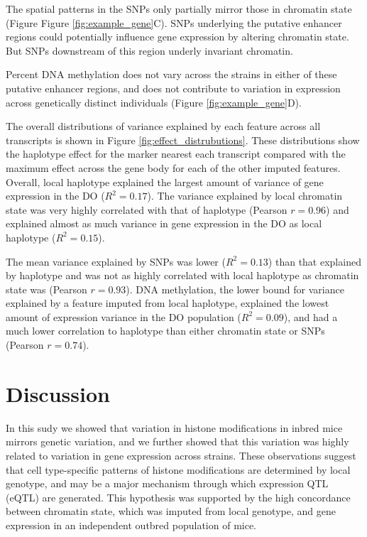 \documentclass[10pt,letterpaper]{article}
\begin{document}
The spatial patterns in the SNPs only partially mirror those in
chromatin state (Figure Figure \ref{fig:example_gene}C). SNPs underlying
the putative enhancer regions could potentially influence gene
expression by altering chromatin state. But SNPs downstream of this
region underly invariant chromatin.

Percent DNA methylation does not vary across the strains in either of
these putative enhancer regions, and does not contribute to variation in
expression across genetically distinct individuals (Figure
\ref{fig:example_gene}D).

The overall distributions of variance explained by each feature across
all transcripts is shown in Figure \ref{fig:effect_distrubutions}. These
distributions show the haplotype effect for the marker nearest each
transcript compared with the maximum effect across the gene body for
each of the other imputed features. Overall, local haplotype explained
the largest amount of variance of gene expression in the DO
(\(R^2 = 0.17\)). The variance explained by local chromatin state was
very highly correlated with that of haplotype (Pearson \(r = 0.96\)) and
explained almost as much variance in gene expression in the DO as local
haplotype (\(R^2 = 0.15\)).

The mean variance explained by SNPs was lower (\(R^2 = 0.13\)) than that
explained by haplotype and was not as highly correlated with local
haplotype as chromatin state was (Pearson \(r = 0.93\)). DNA
methylation, the lower bound for variance explained by a feature imputed
from local haplotype, explained the lowest amount of expression variance
in the DO population (\(R^2 = 0.09\)), and had a much lower correlation
to haplotype than either chromatin state or SNPs (Pearson \(r = 0.74\)).

\hypertarget{discussion}{%
\section{Discussion}\label{discussion}}

In this sudy we showed that variation in histone modifications in inbred
mice mirrors genetic variation, and we further showed that this
variation was highly related to variation in gene expression across
strains. These observations suggest that cell type-specific patterns of
histone modifications are determined by local genotype, and may be a
major mechanism through which expression QTL (eQTL) are generated. This
hypothesis was supported by the high concordance between chromatin
state, which was imputed from local genotype, and gene expression in an
independent outbred population of mice.
\end{document}
